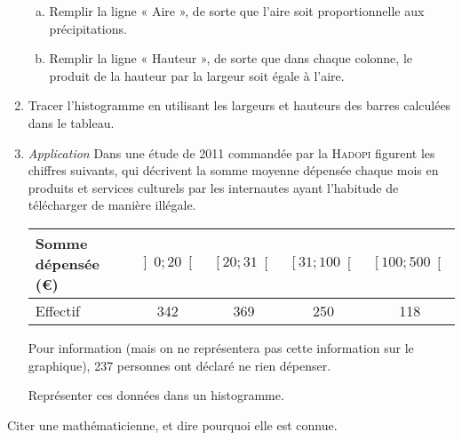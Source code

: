 \documentclass[12pt]{article}
\begin{document}
\begin{exercice}
\begin{enumerate}
      \begin{enumerate}[(a)]
        \item Remplir la ligne « Aire », de sorte que l'aire soit
          proportionnelle aux précipitations.
        \item Remplir la ligne « Hauteur », de sorte que dans chaque colonne, le produit de la hauteur par la largeur soit égale à l'aire.
      \end{enumerate}
    \item Tracer l'histogramme en utilisant les largeurs et hauteurs des barres calculées dans le tableau.
    \item \emph{Application} Dans une étude de 2011 commandée par la \textsc{Hadopi} figurent les chiffres suivants, qui décrivent la somme moyenne dépensée chaque mois en produits et services culturels par les internautes ayant l'habitude de télécharger de manière illégale.

      \begin{center}
        \begin{tabular}{p{4cm}|c|c|c|c}
          Somme dépensée (\euro)
          & $\left] 0;20 \right[$
          & $\left[ 20;31 \right[$
          & $\left[ 31;100 \right[$
          & $\left[ 100;500 \right[$
          \\
          \hline
          Effectif
          & 342
          & 369
          & 250
          & 118
          \\
        \end{tabular}
      \end{center}
      Pour information (mais on ne représentera pas cette information sur le graphique), 237 personnes ont déclaré ne rien dépenser.

      Représenter ces données dans un histogramme.
  \end{enumerate}
\end{exercice}

\begin{exercice}[Histoire]
  Citer une mathématicienne, et dire pourquoi elle est connue.
\end{exercice}
\end{document}
